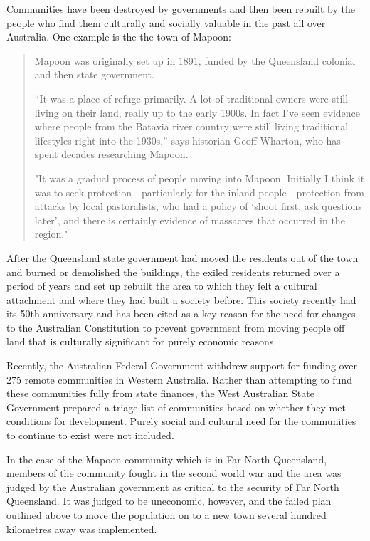 Communities have been destroyed by governments and then been rebuilt by the people who find them culturally and socially valuable in the past all over Australia.  One example is the the town of Mapoon:
\begin{quotation}
Mapoon was originally set up in 1891, funded by the Queensland colonial and then state government.

``It was a place of refuge primarily. A lot of traditional owners were still living on their land, really up to the early 1900s. In fact I've seen evidence where people from the Batavia river country were still living traditional lifestyles right into the 1930s,'' says historian Geoff Wharton, who has spent decades researching Mapoon.

"It was a gradual process of people moving into Mapoon. Initially I think it was to seek protection - particularly for the inland people - protection from attacks by local pastoralists, who had a policy of `shoot first, ask questions later', and there is certainly evidence of massacres that occurred in the region."
\end{quotation}

After the Queensland state government had moved the residents out of the town and burned or demolished the buildings, the exiled residents returned over a period of years and set up rebuilt the area to which they felt a cultural attachment and where they had built a society before. This society recently had its 50th anniversary and has been cited as a key reason for the need for changes to the Australian Constitution to prevent government from moving people off land that is culturally significant for purely economic reasons\cite{RefWorks:301}.

Recently, the Australian Federal Government withdrew support for funding over 275 remote communities in Western Australia. Rather than attempting to fund these communities fully from state finances, the West Australian State  Government prepared a triage list of communities based on whether they met conditions for development. Purely social and cultural need for the communities to continue to exist were not included.

In the case of the Mapoon community which is in Far North Queensland, members of the community fought in the second world war and the area was judged by the Australian government as critical to the security of Far North Queensland. It was judged to be uneconomic, however, and the failed plan outlined above to move the population on to a new town several hundred kilometres away was implemented.

